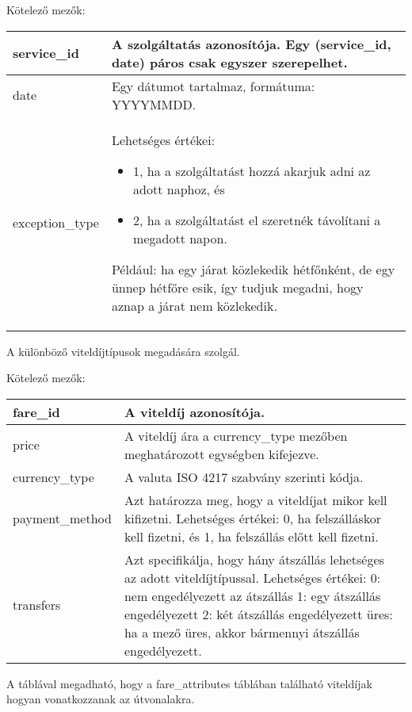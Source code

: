 \medskip

\noindent Kötelező mezők:

\bigskip

\begin{tabular}{|p{3.5cm}|p{10cm}|}
\hline
service\_id & A szolgáltatás azonosítója. Egy (service\_id, date) páros csak egyszer szerepelhet. \\
\hline
date & Egy dátumot tartalmaz, formátuma: YYYYMMDD. \\
\hline
exception\_type & Lehetséges értékei:
\begin{itemize}
\item 1, ha a szolgáltatást hozzá akarjuk adni az adott naphoz, és
\item 2, ha a szolgáltatást el szeretnék távolítani a megadott napon.
\end{itemize}
Például: ha egy járat közlekedik hétfőnként, de egy ünnep hétfőre esik, így tudjuk megadni, hogy aznap a járat nem közlekedik. \\
\hline
\end{tabular}


A különböző viteldíjtípusok megadására szolgál.

\medskip

\noindent Kötelező mezők:

\bigskip

\begin{tabular}{|p{3.5cm}|p{10cm}|}
\hline
fare\_id & A viteldíj azonosítója. \\
\hline
price & A viteldíj ára a currency\_type mezőben meghatározott egységben kifejezve. \\
\hline
currency\_type & A valuta ISO 4217 szabvány szerinti kódja. \\
\hline
payment\_method & Azt határozza meg, hogy a viteldíjat mikor kell kifizetni.
Lehetséges értékei:
0, ha felszálláskor kell fizetni, és
1, ha felszállás előtt kell fizetni. \\
\hline
transfers & Azt specifikálja, hogy hány átszállás lehetséges az adott viteldíjtípussal.
Lehetséges értékei:
0: nem engedélyezett az átszállás
1: egy átszállás engedélyezett
2: két átszállás engedélyezett
üres: ha a mező üres, akkor bármennyi átszállás engedélyezett. \\
\hline
\end{tabular}


A táblával megadható, hogy a fare\_attributes táblában található viteldíjak hogyan vonatkozzanak az útvonalakra.

